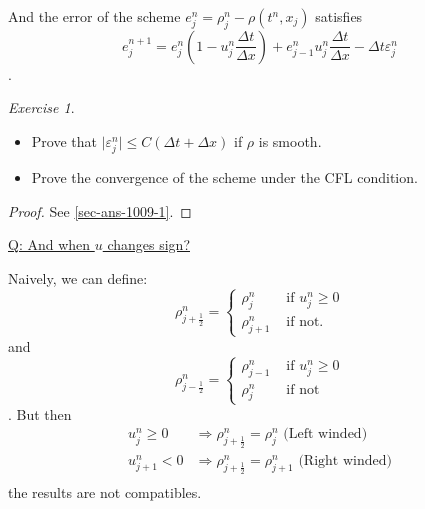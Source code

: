 \documentclass{report}
\theoremstyle{plain}
\theoremstyle{definition}
\theoremstyle{remark}
\newtheorem{exercise}{Exercise}
\begin{document}
And the error of the scheme $e^n_j = \rho^n_j - \rho(t^n,x_j)$
satisfies
\begin{equation}
	e^{n+1}_j = e^n_j(1-u^n_j \frac{ \Delta t}{ \Delta x})
	+ e^n_{j-1} u^n_j \frac{ \Delta t}{ \Delta x} 
	- \Delta t \varepsilon^n_j
\end{equation}.

\begin{exercise}
	\begin{itemize}
\item Prove that 
	$\vert\varepsilon^n_j\vert\le C(\Delta t + \Delta x)$ if
	$\rho$ is smooth.
\item Prove the convergence of the scheme under the CFL condition.
	\end{itemize}
\end{exercise}

\begin{proof}
	See \ref{sec-ans-1009-1}.
\end{proof}

\underline{Q: And when $u$ changes sign?}

Naively, we can define:
\begin{equation}
	\rho^n_{j+\frac{1}{2}} = \left\lbrace
	\begin{array}{ll}
		\rho^n_j & \text{ if } u^n_j \ge 0\\
		\rho^n_{j+1} & \text{ if not. }
	\end{array}\right.
\end{equation}
and
\begin{equation}
	\rho^n_{j-\frac{1}{2}} = \left\lbrace
	\begin{array}{ll}
		\rho^n_{j-1} & \text{ if } u^n_j \ge 0\\
		\rho^n_j & \text{ if not }
	\end{array}\right.
\end{equation}.
But then 
\begin{align*}
	u^n_j\ge 0 &\Rightarrow \rho^n_{j+\frac{1}{2}} 
	= \rho^n_j  \text{ (Left winded)} \\
	u^n_{j+1}< 0 &\Rightarrow \rho^n_{j+\frac{1}{2}} 
	= \rho^n_{j+1}  \text{ (Right winded)}  \\
\end{align*}
the results are not compatibles.
\end{document}
